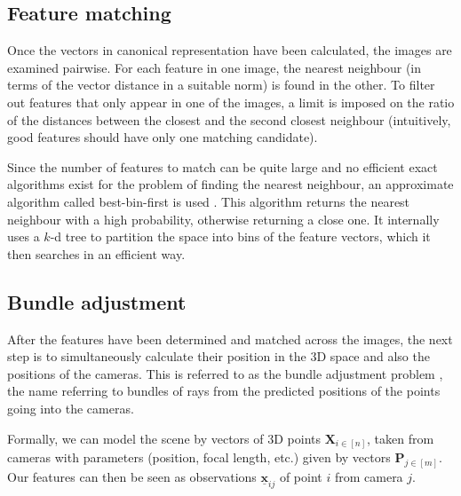 \subsection{Feature matching}
Once the vectors in canonical representation have been calculated, the images are examined pairwise.
For each feature in one image, the nearest neighbour (in terms of the vector distance in a suitable norm) is found in the other.
To filter out features that only appear in one of the images, a limit is imposed on the ratio of the distances between the closest and the second closest neighbour (intuitively, good features should have only one matching candidate).

Since the number of features to match can be quite large and no efficient exact algorithms exist for the problem of finding the nearest neighbour, an approximate algorithm called best-bin-first is used \cite{beis1997shape}.
This algorithm returns the nearest neighbour with a high probability, otherwise returning a close one.
It internally uses a $k$-d tree to partition the space into bins of the feature vectors, which it then searches in an efficient way.

\subsection{Bundle adjustment}
After the features have been determined and matched across the images, the next step is to simultaneously calculate their position in the 3D space and also the positions of the cameras.
This is referred to as the bundle adjustment problem \cite{snavely2008modeling,schneider19913}, the name referring to bundles of rays from the predicted positions of the points going into the cameras.

Formally, we can model the scene by vectors of 3D points $\mathbf{X}_{i \in [n]}$, taken from cameras with parameters (position, focal length, etc.) given by vectors $\mathbf{P}_{j \in [m]}$.
Our features can then be seen as observations $\underline{\bm{x}}_{ij}$ of point $i$ from camera $j$.

